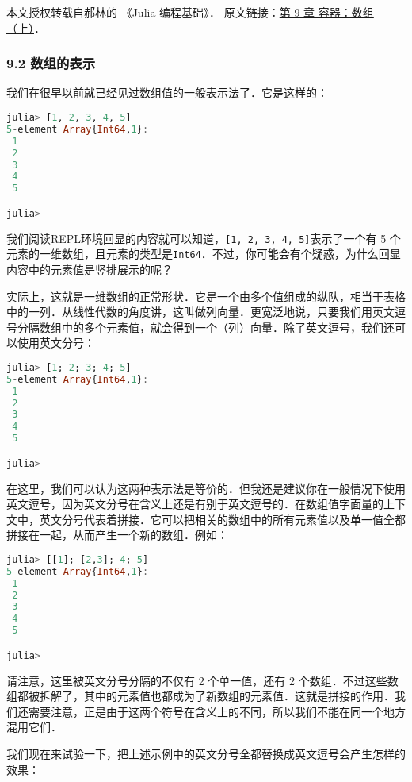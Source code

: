 
本文授权转载自郝林的 《Julia 编程基础》． 原文链接：\href{https://github.com/hyper0x/JuliaBasics/blob/master/book/ch09.md}{第 9 章 容器：数组（上）}．


\subsubsection{9.2 数组的表示}

我们在很早以前就已经见过数组值的一般表示法了．它是这样的：

\begin{lstlisting}[language=julia]
julia> [1, 2, 3, 4, 5]
5-element Array{Int64,1}:
 1
 2
 3
 4
 5

julia> 
\end{lstlisting}

我们阅读REPL环境回显的内容就可以知道，\verb|[1, 2, 3, 4, 5]|表示了一个有 5 个元素的一维数组，且元素的类型是\verb|Int64|．不过，你可能会有个疑惑，为什么回显内容中的元素值是竖排展示的呢？

实际上，这就是一维数组的正常形状．它是一个由多个值组成的纵队，相当于表格中的一列．从线性代数的角度讲，这叫做列向量．更宽泛地说，只要我们用英文逗号分隔数组中的多个元素值，就会得到一个（列）向量．除了英文逗号，我们还可以使用英文分号：

\begin{lstlisting}[language=julia]
julia> [1; 2; 3; 4; 5]
5-element Array{Int64,1}:
 1
 2
 3
 4
 5

julia> 
\end{lstlisting}

在这里，我们可以认为这两种表示法是等价的．但我还是建议你在一般情况下使用英文逗号，因为英文分号在含义上还是有别于英文逗号的．在数组值字面量的上下文中，英文分号代表着拼接．它可以把相关的数组中的所有元素值以及单一值全都拼接在一起，从而产生一个新的数组．例如：

\begin{lstlisting}[language=julia]
julia> [[1]; [2,3]; 4; 5]
5-element Array{Int64,1}:
 1
 2
 3
 4
 5

julia>
\end{lstlisting}

请注意，这里被英文分号分隔的不仅有 2 个单一值，还有 2 个数组．不过这些数组都被拆解了，其中的元素值也都成为了新数组的元素值．这就是拼接的作用．我们还需要注意，正是由于这两个符号在含义上的不同，所以我们不能在同一个地方混用它们．

我们现在来试验一下，把上述示例中的英文分号全都替换成英文逗号会产生怎样的效果：

